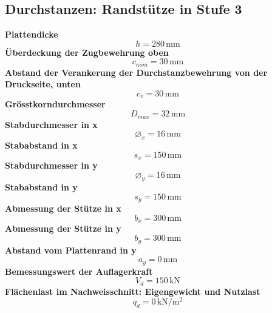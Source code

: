 \documentclass[11pt,a4paper]{article}
\begin{document}
\subsection{Durchstanzen: Randstütze in Stufe 3}
\noindent\textbf{Plattendicke}
\begin{equation*}
h = 280\,\mathrm{mm}
\end{equation*}
\noindent\textbf{Überdeckung der Zugbewehrung oben}
\begin{equation*}
c_{nom} = 30\,\mathrm{mm}
\end{equation*}
\noindent\textbf{Abstand der Verankerung der Durchstanzbewehrung von der Druckseite, unten}
\begin{equation*}
c_v = 30\,\mathrm{mm}
\end{equation*}
\noindent\textbf{Grösstkorndurchmesser}
\begin{equation*}
D_{max} = 32\,\mathrm{mm}
\end{equation*}
\noindent\textbf{Stabdurchmesser in x}
\begin{equation*}
\varnothing_x = 16\,\mathrm{mm}
\end{equation*}
\noindent\textbf{Stababstand in x}
\begin{equation*}
s_x = 150\,\mathrm{mm}
\end{equation*}
\noindent\textbf{Stabdurchmesser in y}
\begin{equation*}
\varnothing_y = 16\,\mathrm{mm}
\end{equation*}
\noindent\textbf{Stababstand in y}
\begin{equation*}
s_y = 150\,\mathrm{mm}
\end{equation*}
\noindent\textbf{Abmessung der Stütze in x}
\begin{equation*}
b_x = 300\,\mathrm{mm}
\end{equation*}
\noindent\textbf{Abmessung der Stütze in y}
\begin{equation*}
b_y = 300\,\mathrm{mm}
\end{equation*}
\noindent\textbf{Abstand vom Plattenrand in y}
\begin{equation*}
a_y = 0\,\mathrm{mm}
\end{equation*}
\noindent\textbf{Bemessungswert der Auflagerkraft}
\begin{equation*}
V_d = 150\,\mathrm{kN}
\end{equation*}
\noindent\textbf{Flächenlast im Nachweisschnitt: Eigengewicht und Nutzlast}
\begin{equation*}
q_d = 0\,\mathrm{kN}/\mathrm{m}^{2}
\end{equation*}
\end{document}
